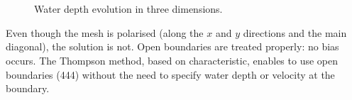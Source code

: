 \begin{figure}[!htbp]
\begin{minipage}[t]{0.50\textwidth}
 \centering
\end{minipage}%
\begin{minipage}[t]{0.50\textwidth}
 \centering
\end{minipage}\\
\begin{minipage}[t]{0.50\textwidth}
 \centering
\end{minipage}%
\begin{minipage}[t]{0.50\textwidth}
 \centering
\end{minipage}\\
\begin{minipage}[t]{0.50\textwidth}
 \centering
\end{minipage}%
\begin{minipage}[t]{0.50\textwidth}
 \centering
\end{minipage}
 \caption{Water depth evolution in three dimensions.}
 \label{t3d:thomson:fig:depth_evol3D}
\end{figure}
%

\bigskip
Even though the mesh is polarised (along the $x$ and $y$ directions and
the main diagonal), the solution is not.
Open boundaries are treated properly: no bias occurs.
The Thompson method, based on characteristic,
enables to use open boundaries (444) without the need to specify water
depth or velocity at the boundary.
